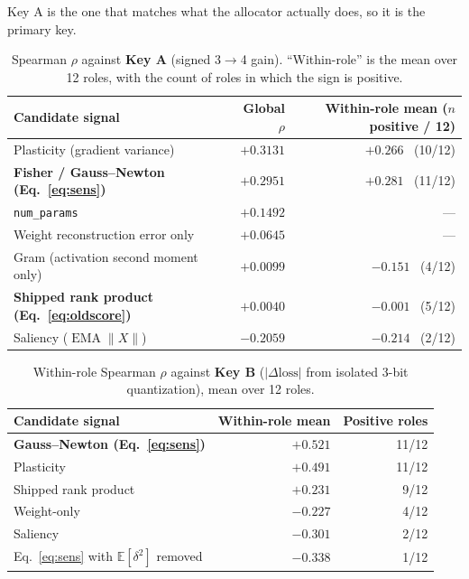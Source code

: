 \documentclass[11pt]{article}
\newcommand{\code}[1]{\texttt{#1}}
\begin{document}
Key A is the one that matches what the allocator actually does, so it is the primary key.

\begin{table}[H]
\centering\small
\caption{Spearman $\rho$ against \textbf{Key A} (signed 3$\to$4 gain). ``Within-role'' is the mean
over 12 roles, with the count of roles in which the sign is positive.}
\begin{tabular}{lrr}
\toprule
Candidate signal & Global $\rho$ & Within-role mean ($n$ positive / 12) \\
\midrule
Plasticity (gradient variance) & $+0.3131$ & $+0.266$ \ (10/12) \\
\rowcolor{rowtint}
\textbf{Fisher / Gauss--Newton (Eq.~\ref{eq:sens})} & $\mathbf{+0.2951}$ & $\mathbf{+0.281}$ \ (11/12) \\
\code{num\_params} & $+0.1492$ & --- \\
\rowcolor{rowtint}
Weight reconstruction error only & $+0.0645$ & --- \\
Gram (activation second moment only) & $+0.0099$ & $-0.151$ \ (4/12) \\
\rowcolor{rowtint}
\textbf{Shipped rank product (Eq.~\ref{eq:oldscore})} & $\mathbf{+0.0040}$ & $-0.001$ \ (5/12) \\
Saliency ($\operatorname{EMA}\lVert X\rVert$) & $\mathbf{-0.2059}$ & $-0.214$ \ (2/12) \\
\bottomrule
\end{tabular}
\end{table}

\begin{table}[H]
\centering\small
\caption{Within-role Spearman $\rho$ against \textbf{Key B} ($|\Delta\text{loss}|$ from isolated
3-bit quantization), mean over 12 roles.}
\begin{tabular}{lrr}
\toprule
Candidate signal & Within-role mean & Positive roles \\
\midrule
\rowcolor{rowtint}
\textbf{Gauss--Newton (Eq.~\ref{eq:sens})} & $\mathbf{+0.521}$ & 11/12 \\
Plasticity & $+0.491$ & 11/12 \\
\rowcolor{rowtint}
Shipped rank product & $+0.231$ & 9/12 \\
Weight-only & $-0.227$ & 4/12 \\
\rowcolor{rowtint}
Saliency & $-0.301$ & 2/12 \\
Eq.~\ref{eq:sens} with $\mathbb{E}[\delta^2]$ removed & $\mathbf{-0.338}$ & 1/12 \\
\bottomrule
\end{tabular}
\end{table}
\end{document}
